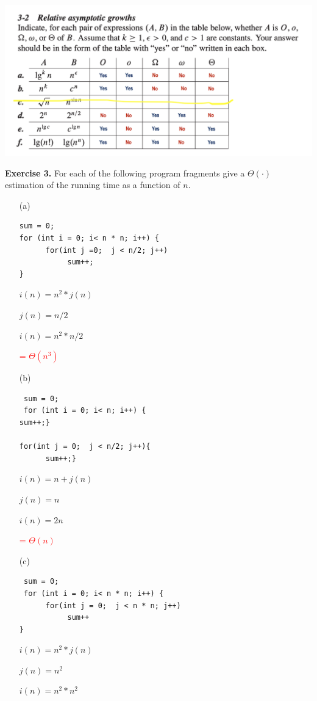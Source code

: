 \documentclass[11pt]{article}
\begin{document}
\includegraphics[scale=0.65]{table.png}

\textbf{Exercise 3.}
For each of the following program fragments give a $\Theta(\cdot)$  estimation of the running time as a function of $n$.
\begin{itemize}
\item[(a)]
\begin{verbatim}
sum = 0;
for (int i = 0; i< n * n; i++) {
      for(int j =0;  j < n/2; j++)
    	   sum++;
}

\end{verbatim}

$i(n) = n^2 * j(n)$

$j(n) = n/2$

$i(n) = n^2 * n/2$

\textcolor{red}{= $\Theta(n^3)$}

\medskip\item[(b)]
\begin{verbatim}
 sum = 0;
 for (int i = 0; i< n; i++) {
sum++;}

for(int j = 0;  j < n/2; j++){
      sum++;}

\end{verbatim}

$i(n) = n + j(n)$

$j(n) = n$

$i(n) = 2n$

\textcolor{red}{= $\Theta(n)$}

\medskip\item[(c)]
\begin{verbatim}
 sum = 0;
 for (int i = 0; i< n * n; i++) {
      for(int j = 0;  j < n * n; j++)
           sum++
}
\end{verbatim}

$i(n) = n^2 * j(n)$

$j(n) = n^2$

$i(n) = n^2 * n^2$


\end{itemize}
\end{document}
